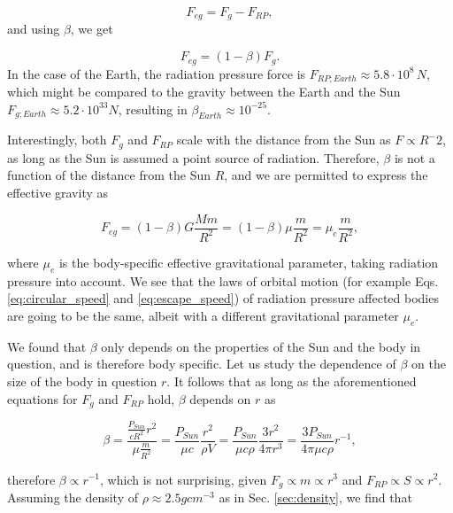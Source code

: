 \begin{equation}
    F_{eg} = F_g - F_{RP},
\end{equation}
and using $\beta$, we get

\begin{equation}
    F_{eg} = (1-\beta) F_g.
\end{equation}
In the case of the Earth, the radiation pressure force is $F_{RP;Earth} \approx 5.8 \cdot 10^8 \, \si{N}$, which might be compared to the gravity between the Earth and the Sun $F_{g;Earth} \approx 5.2 \cdot 10^{33} \si{N}$, resulting in $\beta_{Earth} \approx 10^{-25}$. 

Interestingly, both $F_g$ and $F_{RP}$ scale with the distance from the Sun as $F \propto {R^-2}$, as long as the Sun is assumed a point source of radiation. Therefore, $\beta$ is not a function of the distance from the Sun $R$, and we are permitted to express the effective gravity as 

\begin{equation}
    F_{eg} = (1-\beta) G \frac{M m}{R^2} = (1-\beta) \mu \frac{m}{R^2} = \mu_{e} \frac{m}{R^2},
\end{equation}

where $\mu_{e}$ is the body-specific effective gravitational parameter, taking radiation pressure into account. We see that the laws of orbital motion (for example Eqs. \ref{eq:circular_speed} and \ref{eq:escape_speed}) of radiation pressure affected bodies are going to be the same, albeit with a different gravitational parameter $\mu_e$.

We found that $\beta$ only depends on the properties of the Sun and the body in question, and is therefore body specific. Let us study the dependence of $\beta$ on the size of the body in question $r$. It follows that as long as the aforementioned equations for $F_{g}$ and $F_{RP}$ hold, $\beta$ depends on $r$ as 

\begin{equation} 
    \beta = \frac{\frac{P_{Sun}}{c R^2} r^2}{\mu \frac{m}{R^2}} = \frac{P_{Sun}}{\mu c} \frac{r^2}{\rho V} = \frac{P_{Sun}}{\mu c \rho} \frac{3 r^2}{4 \pi r^3} = \frac{3 P_{Sun}}{4 \pi \mu c \rho} r^{-1},
\end{equation}

therefore $\beta \propto r^{-1}$, which is not surprising, given $F_{g} \propto m \propto r^{3}$ and 
$F_{RP} \propto S \propto r^{2}$. Assuming the density of $\rho \approx 2.5 \si{gcm^{-3}}$ as in Sec. \ref{sec:density}, we find that 

